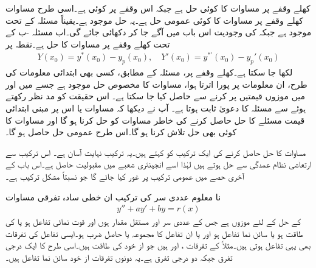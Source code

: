 کھلے وقفے  پر  مساوات  کا کوئی حل ہے جبکہ  اس وقفے پر کوئی  ہے۔اسی طرح مساوات  کھلے وقفے پر مساوات  کا کوئی عمومی حل ہے۔یہ حل موجود ہے۔یقیناً  مسئلہ  کے تحت موجود ہے جبکہ  کی وجودیت اس باب میں آگے جا کر  دکھائی جائے گی۔اب مسئلہ -ب کے تحت   کھلے وقفے پر مساوات  کا حل ہے۔نقطہ  پر
\begin{align*}
Y(x_0)=y^*(x_0)-y_p(x_0), \quad Y'(x_0)=y^{*'}(x_0)-y_p'(x_0)
\end{align*}
لکھا جا سکتا ہے۔کھلے وقفے   پر، مسئلہ  کے مطابق، کسی بھی ابتدائی معلومات کی طرح، ان معلومات پر پورا اترتا ہوا، مساوات  کا مخصوص حل موجود ہے جسے  میں  اور  میں موزوں  قیمتیں پر کرنے سے حاصل کیا جا سکتا ہے۔  اس حقیقت کو مد نظر رکھتے ہوئے   سے مسئلہ کا دعویٰ ثابت ہوتا ہے۔
آپ نے دیکھا کہ مساوات  یا اس پر مبنی ابتدائی قیمت مسئلے کا حل  حاصل کرنے کی خاطر مساوات  کو حل کرنا ہو گا اور مساوات  کا کوئی بھی حل   تلاش کرنا ہو گا۔اس طرح عمومی حل  حاصل ہو گا۔

مساوات  کا حل  حاصل کرنے کی ایک ترکیب کو   کہتے ہیں۔یہ ترکیب نہایت آسان ہے۔ اس ترکیب سے ارتعاشی نظام عمدگی سے حل ہوتے ہیں لہٰذا اسے انجینئری شعبے میں مقبولیت حاصل ہے۔اس باب کے آخری حصے میں عمومی ترکیب پر غور کیا جائے گا جو نسبتاً مشکل ترکیب ہے۔

نا معلوم عددی سر کی ترکیب ان خطی سادہ تفرقی مساوات
\begin{align}\label{مساوات_سادہ_دو_نا_معلوم_الف}
y''+ay'+by=r(x)
\end{align}
 کے حل کے لئے موزوں ہے جس کے عددی سر  اور  مستقل مقدار ہوں اور  قوت نمائی تفاعل ہو یا  کی طاقت ہو یا  سائن نما تفاعل ہو اور یا ان تفاعل کا مجموعہ یا حاصل ضرب ہو۔ایسی تفاعل کی تفرقات بھی یہی تفاعل ہوتی ہیں۔مثلاً  کے تفرقات   ،  اور  ہیں جو از خود  کی طاقت ہیں۔اسی طرح  کا ایک درجی تفرق  جبکہ دو درجی تفرق  ہے۔یہ دونوں تفرقات از خود  سائن نما تفاعل ہیں۔


